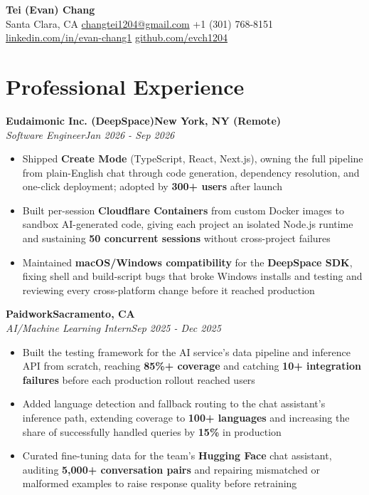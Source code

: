 \documentclass[letterpaper,11pt]{article}
\newcommand{\jobentry}[4]{%
  \textbf{#1}\hfill\textbf{#2}\\
  \textit{#3}\hfill\textit{#4}\par\vspace{1pt}}
\newcommand{\entrygap}{\vspace{4pt}}
\begin{document}
\begin{center}
  {\fontsize{22pt}{24pt}\selectfont\textbf{Tei (Evan) Chang}}\\[3pt]
  Santa Clara, CA \textbullet{} \href{mailto:changtei1204@gmail.com}{changtei1204@gmail.com} \textbullet{} +1 (301) 768-8151 \textbullet{} \href{https://linkedin.com/in/evan-chang1}{linkedin.com/in/evan-chang1} \textbullet{} \href{https://github.com/evch1204}{github.com/evch1204}
\end{center}

\section{Professional Experience}

\jobentry{Eudaimonic Inc. (DeepSpace)}{New York, NY (Remote)}{Software Engineer}{Jan 2026 - Sep 2026}
\begin{itemize}
  \item Shipped \textbf{Create Mode} (TypeScript, React, Next.js), owning the full pipeline from plain-English chat through code generation, dependency resolution, and one-click deployment; adopted by \textbf{300+ users} after launch
  \item Built per-session \textbf{Cloudflare Containers} from custom Docker images to sandbox AI-generated code, giving each project an isolated Node.js runtime and sustaining \textbf{50 concurrent sessions} without cross-project failures
  \item Maintained \textbf{macOS/Windows compatibility} for the \textbf{DeepSpace SDK}, fixing shell and build-script bugs that broke Windows installs and testing and reviewing every cross-platform change before it reached production
\end{itemize}
\entrygap

\jobentry{Paidwork}{Sacramento, CA}{AI/Machine Learning Intern}{Sep 2025 - Dec 2025}
\begin{itemize}
  \item Built the testing framework for the AI service's data pipeline and inference API from scratch, reaching \textbf{85\%+ coverage} and catching \textbf{10+ integration failures} before each production rollout reached users
  \item Added language detection and fallback routing to the chat assistant's inference path, extending coverage to \textbf{100+ languages} and increasing the share of successfully handled queries by \textbf{15\%} in production
  \item Curated fine-tuning data for the team's \textbf{Hugging Face} chat assistant, auditing \textbf{5,000+ conversation pairs} and repairing mismatched or malformed examples to raise response quality before retraining
\end{itemize}
\entrygap
\end{document}
